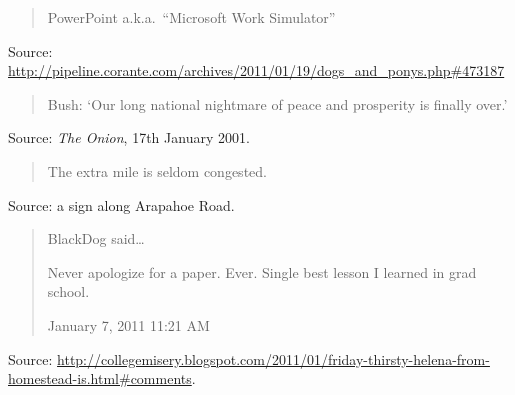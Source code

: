 \documentclass[a4paper]{article}
\begin{document}
\begin{quote}
	PowerPoint a.k.a.\ ``Microsoft Work Simulator''
\end{quote}
Source: \url{http://pipeline.corante.com/archives/2011/01/19/dogs_and_ponys.php#473187}
\medskip

\begin{quote}
	Bush: `Our long national nightmare of peace and prosperity is finally over.'
\end{quote}
Source: \emph{The Onion}, 17th January 2001.
\medskip

\begin{quote}
	The extra mile is seldom congested.
\end{quote}
Source: a sign along Arapahoe Road.
\medskip

\begin{quote}
	BlackDog said\ldots

    Never apologize for a paper. Ever. Single best lesson I learned in grad school.

    January 7, 2011 11:21 AM 
\end{quote}
Source: \url{http://collegemisery.blogspot.com/2011/01/friday-thirsty-helena-from-homestead-is.html#comments}.
\medskip
\end{document}
